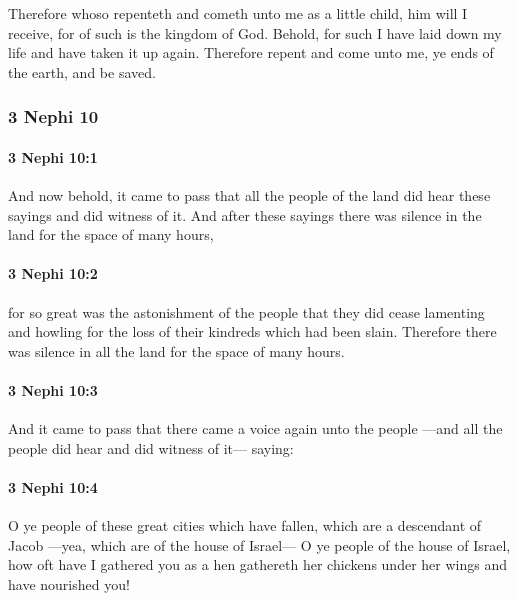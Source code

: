 			Therefore whoso repenteth and cometh unto me as a little child,
			him will I receive,
			for of such is the kingdom of God.
			Behold, for such I have laid down my life and have taken it up again.
			Therefore repent and come unto me, ye ends of the earth, and be saved.

	\subsubsection{3 Nephi 10} %
		\label{3NEPHI-10}
		
		\paragraph{3 Nephi 10:1} %
			\label{3NEPHI-10-1}

			And now behold, it came to pass that
			all the people of the land did hear these sayings and did witness of it.
			And after these sayings there was silence in the land for the space of many hours,

		\paragraph{3 Nephi 10:2} %
			\label{3NEPHI-10-2}

			for so great was the astonishment of the people
			that they did cease lamenting and howling
			for the loss of their kindreds which had been slain.
			Therefore there was silence in all the land for the space of many hours.

		\paragraph{3 Nephi 10:3} %
			\label{3NEPHI-10-3}

			And it came to pass that
			there came a voice again unto the people
			---and all the people did hear and did witness of it---
			saying:

		\paragraph{3 Nephi 10:4} %
			\label{3NEPHI-10-4}

			O ye people of these great cities which have fallen,
			which are a descendant of Jacob
			---yea, which are of the house of Israel---
			O ye people of the house of Israel,
			how oft have I gathered you
			as a hen gathereth her chickens under her wings
			and have nourished you!

